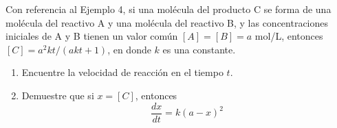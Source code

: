 \item Con referencia al Ejemplo 4, si una molécula del producto C se forma de una molécula del reactivo A y una molécula del reactivo B, y las concentraciones iniciales de A y B tienen un valor común $[A] = [B] = a$ mol/L, entonces $[C] = a^2kt / (akt + 1)$, en donde $k$ es una constante.
\begin{enumerate}
    \item[(a)] Encuentre la velocidad de reacción en el tiempo $t$.
    \item[(b)] Demuestre que si $x = [C]$, entonces
    $$\frac{dx}{dt} = k(a - x)^2$$
\end{enumerate}

